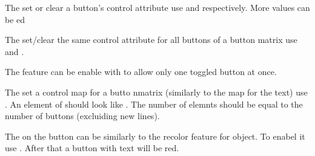 \documentclass[letterpaper,10pt,english]{sphinxmanual}
\begin{document}
The set or clear a button’s control attribute use  and  respectively. More  values can be ed

The set/clear the same control attribute for all buttons of a button matrix use  and .

The  feature can be enable with  to allow only one toggled button at once.

The set a control map for a butto nmatrix (similarly to the map for the text) use .
An element of  should look like . The number of elemnts should be equal to the number of buttons (excluiding new lines).

The  on the button can be  similarly to the recolor feature for {\hyperref[\detokenize{object-types/label::doc}]{}} object. To enabel it use . After that a button with  text will be red.
\end{document}
